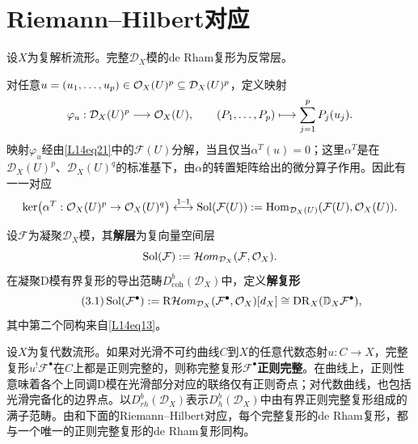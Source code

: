 \section{Riemann--Hilbert对应}\label{L14S3}
\begin{theorem}[Kashiwara]\label{L14S3O1}
设$X$为复解析流形。完整$\mathcal D_X$模的de Rham复形为反常层。
\end{theorem}
对任意$u=(u_1,\ldots,u_p)\in\mathcal O_X(U)^p\subseteq\mathcal D_X(U)^p$，定义映射
\[\varphi_u:\mathcal D_X(U)^p\longrightarrow\mathcal O_X(U),\qquad (P_1,\ldots,P_p)\longmapsto\sum_{j=1}^pP_j(u_j).\]
映射$\varphi_u$经由\eqref{L14eq21}中的$\mathcal F(U)$分解，当且仅当$\alpha^T(u)=0$；这里$\alpha^T$是在$\mathcal D_X(U)^p$、$\mathcal D_X(U)^q$的标准基下，由$\alpha$的转置矩阵给出的微分算子作用。因此有一一对应
\[\ker\bigl(\alpha^T:\mathcal O_X(U)^p\to\mathcal O_X(U)^q\bigr)\mathrel{\overset{1\text{--}1}{\longleftrightarrow}}\operatorname{Sol}(\mathcal F(U)):=\operatorname{Hom}_{\mathcal D_X(U)}(\mathcal F(U),\mathcal O_X(U)).\]
\begin{definition}\label{L14S3O2}
设$\mathcal F$为凝聚$\mathcal D_X$模，其\textbf{解层}为复向量空间层
\[\operatorname{Sol}(\mathcal F):=\mathcal Hom_{\mathcal D_X}(\mathcal F,\mathcal O_X).\]
在凝聚D模有界复形的导出范畴$D_{\mathrm{coh}}^b(\mathcal D_X)$中，定义\textbf{解复形}
\begin{equation}\tag{3.1}\label{L14eq31}
\operatorname{Sol}(\mathcal F^\bullet):=\mathrm R\mathcal Hom_{\mathcal D_X}(\mathcal F^\bullet,\mathcal O_X)[d_X]\cong\operatorname{DR}_X(\mathbb D_X\mathcal F^\bullet),
\end{equation}
其中第二个同构来自\eqref{L14eq13}。
\end{definition}
设$X$为复代数流形。如果对光滑不可约曲线$C$到$X$的任意代数态射$u:C\to X$，完整复形$u^!\mathcal F^\bullet$在$C$上都是正则完整的，则称完整复形$\mathcal F^\bullet$\textbf{正则完整}。在曲线上，正则性意味着各个上同调D模在光滑部分对应的联络仅有正则奇点；对代数曲线，也包括光滑完备化的边界点。以$D_{rh}^b(\mathcal D_X)$表示$D_h^b(\mathcal D_X)$中由有界正则完整复形组成的满子范畴。由和下面的Riemann--Hilbert对应，每个完整复形的de Rham复形，都与一个唯一的正则完整复形的de Rham复形同构。
